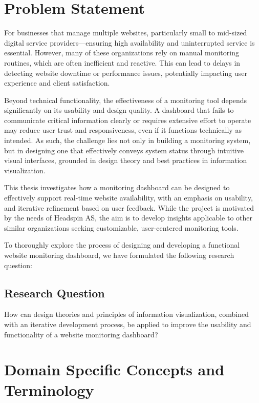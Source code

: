 \section{Problem Statement}
\label{sec:problem_statement}

For businesses that manage multiple websites, particularly small to mid-sized digital service providers—ensuring high availability and uninterrupted service is essential. However, many of these organizations rely on manual monitoring routines, which are often inefficient and reactive. This can lead to delays in detecting website downtime or performance issues, potentially impacting user experience and client satisfaction. 

Beyond technical functionality, the effectiveness of a monitoring tool depends significantly on its usability and design quality. A dashboard that fails to communicate critical information clearly or requires extensive effort to operate may reduce user trust and responsiveness, even if it functions technically as intended. As such, the challenge lies not only in building a monitoring system, but in designing one that effectively conveys system status through intuitive visual interfaces, grounded in design theory and best practices in information visualization.

This thesis investigates how a monitoring dashboard can be designed to effectively support real-time website availability, with an emphasis on usability, and iterative refinement based on user feedback. While the project is motivated by the needs of Headspin AS, the aim is to develop insights applicable to other similar organizations seeking customizable, user-centered monitoring tools.

To thoroughly explore the process of designing and developing a functional website monitoring dashboard, we have formulated the following research question:

\subsection{Research Question}

How can design theories and principles of information visualization, combined with an iterative development process, be applied to improve the usability and functionality of a website monitoring dashboard?


\section{Domain Specific Concepts and Terminology}

